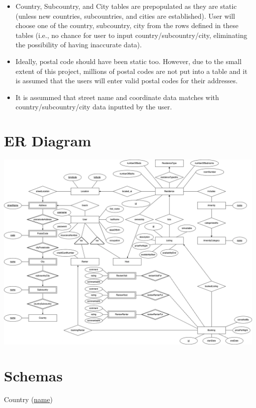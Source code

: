 \documentclass[11pt]{article}
\begin{document}
\begin{itemize}
\item Country, Subcountry, and City tables are prepopulated as they are static (unless new countries, subcountries, and cities are established).
User will choose one of the country, subcountry, city from the rows defined in these tables (i.e., no chance for user to input country/subcountry/city, eliminating the possibility of having inaccurate data).

\item Ideally, postal code should have been static too. However, due to the small extent of this project, millions of postal codes are not put into a table and it is assumed that the users will enter valid postal codes for their addresses.

\item It is assummed that street name and coordinate data matches with country/subcountry/city data inputted by the user.

\end{itemize}

\newpage
\section*{ER Diagram}

\includegraphics[scale=0.35]{er}

\newpage
\section*{Schemas}

Country (\underline{name})
\end{document}
